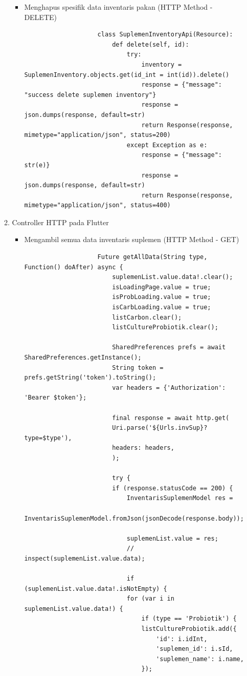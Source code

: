 \begin{spacing}{1.5}
\begin{enumerate}
\begin{enumerate}
\begin{itemize}
				\item Menghapus spesifik data inventaris pakan (HTTP Method - DELETE)
				
				\begin{lstlisting}
					class SuplemenInventoryApi(Resource):
						def delete(self, id):
							try:
								inventory = SuplemenInventory.objects.get(id_int = int(id)).delete()
								response = {"message": "success delete suplemen inventory"}
								response = json.dumps(response, default=str)
								return Response(response, mimetype="application/json", status=200)
							except Exception as e:
								response = {"message": str(e)}
								response = json.dumps(response, default=str)
								return Response(response, mimetype="application/json", status=400)
				\end{lstlisting}
			\end{itemize}

			\item Controller HTTP pada Flutter
			
			\begin{itemize}
				\item Mengambil semua data inventaris suplemen (HTTP Method - GET)
				
				\begin{lstlisting}
					Future getAllData(String type, Function() doAfter) async {
						suplemenList.value.data!.clear();
						isLoadingPage.value = true;
						isProbLoading.value = true;
						isCarbLoading.value = true;
						listCarbon.clear();
						listCultureProbiotik.clear();

						SharedPreferences prefs = await SharedPreferences.getInstance();
						String token = prefs.getString('token').toString();
						var headers = {'Authorization': 'Bearer $token'};

						final response = await http.get(
						Uri.parse('${Urls.invSup}?type=$type'),
						headers: headers,
						);

						try {
						if (response.statusCode == 200) {
							InventarisSuplemenModel res =
								InventarisSuplemenModel.fromJson(jsonDecode(response.body));

							suplemenList.value = res;
							// inspect(suplemenList.value.data);

							if (suplemenList.value.data!.isNotEmpty) {
							for (var i in suplemenList.value.data!) {
								if (type == 'Probiotik') {
								listCultureProbiotik.add({
									'id': i.idInt,
									'suplemen_id': i.sId,
									'suplemen_name': i.name,
								});


\end{lstlisting}
\end{itemize}
\end{enumerate}
\end{enumerate}
\end{spacing}
